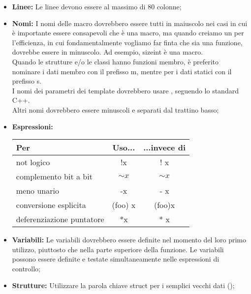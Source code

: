 \documentclass[../NomeDocumento.tex]{subfiles}
\begin{document}
	\begin{itemize}
		
		\item \textbf{Linee:} Le linee devono essere al massimo di 80 colonne;
		
		\item \textbf{Nomi:} I nomi delle macro dovrebbero essere tutti in maiuscolo nei casi in cui è importante essere consapevoli che è una macro, ma quando creiamo un  per l'efficienza, in cui fondamentalmente vogliamo far finta che sia una funzione, dovrebbe essere in minuscolo. Ad esempio, size\textunderscore int è una macro.\\
		Quando le strutture e/o le classi hanno funzioni membro, è preferito nominare i dati membro con il prefisso m\textunderscore , mentre per i dati statici con il prefisso s\textunderscore .\\
		I nomi dei parametri dei template dovrebbero usare , seguendo lo standard C++.\\
		Altri nomi dovrebbero essere minuscoli e separati dal trattino basso;
		
		\item \textbf{Espressioni:}
		\begin{center}
		\begin{tabular}{|l|c|c|}
			\hline
			Per&Uso...&...invece di \\ \hline
			not logico&!x&! x \\ \hline
			complemento bit a bit&${\sim}x$&$\sim x$ \\ \hline
			meno unario&-x&- x \\ \hline
			conversione esplicita&(foo) x&(foo)x \\ \hline
			deferenziazione puntatore&*x&* x \\ \hline
		\end{tabular}
		\end{center}
		
		\item \textbf{Variabili:} Le variabili dovrebbero essere definite nel momento del loro primo utilizzo, piuttosto che nella parte superiore della funzione. Le variabili possono essere definite e testate simultaneamente nelle espressioni di controllo;
		
		\item \textbf{Strutture:} Utilizzare la parola chiave struct per i semplici vecchi dati ();
		

\end{itemize}
\end{document}
